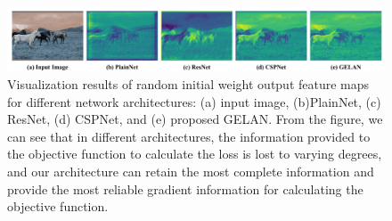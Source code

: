             \begin{figure}[H]
                \centering
                \includegraphics[width=0.8\linewidth]{img/gelan.png}
                \caption{Visualization results of random initial weight output feature maps for different network architectures: (a) input image, (b)PlainNet, (c) ResNet, (d) CSPNet, and (e) proposed GELAN. From the figure, we can see that in different architectures, the information provided to the objective function to calculate the loss is lost to varying degrees, and our architecture can retain the most complete information and provide the most reliable gradient information for calculating the objective function.}
                \label{fig:gelan}
            \end{figure}
